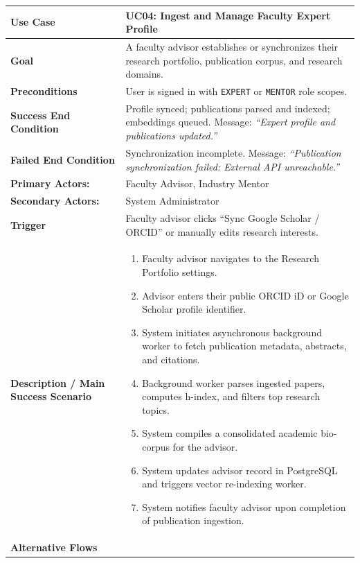 \begin{table}[H]
\centering
\small
\begin{tabularx}{\textwidth}{|l|X|}
\hline
\rowcolor{lightgray!40} \textbf{Use Case} & \textbf{UC04: Ingest and Manage Faculty Expert Profile} \\ \hline
\textbf{Goal} & A faculty advisor establishes or synchronizes their research portfolio, publication corpus, and research domains. \\ \hline
\textbf{Preconditions} & User is signed in with \texttt{EXPERT} or \texttt{MENTOR} role scopes. \\ \hline
\textbf{Success End Condition} & Profile synced; publications parsed and indexed; embeddings queued. Message: \textit{``Expert profile and publications updated.''} \\ \hline
\textbf{Failed End Condition} & Synchronization incomplete. Message: \textit{``Publication synchronization failed: External API unreachable.''} \\ \hline
\textbf{Primary Actors:} & Faculty Advisor, Industry Mentor \\
\textbf{Secondary Actors:} & System Administrator \\ \hline
\textbf{Trigger} & Faculty advisor clicks ``Sync Google Scholar / ORCID'' or manually edits research interests. \\ \hline
\textbf{Description / Main Success Scenario} &
\begin{enumerate}[leftmargin=*]
    \item Faculty advisor navigates to the Research Portfolio settings.
    \item Advisor enters their public ORCID iD or Google Scholar profile identifier.
    \item System initiates asynchronous background worker to fetch publication metadata, abstracts, and citations.
    \item Background worker parses ingested papers, computes h-index, and filters top research topics.
    \item System compiles a consolidated academic bio-corpus for the advisor.
    \item System updates advisor record in PostgreSQL and triggers vector re-indexing worker.
    \item System notifies faculty advisor upon completion of publication ingestion.
\end{enumerate} \\ \hline
\textbf{Alternative Flows} &
\begin{itemize}[leftmargin=*]

\end{itemize}
\end{tabularx}
\end{table}
